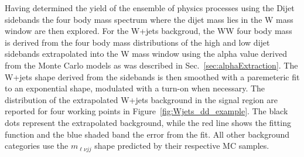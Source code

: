 Having determined the yield of the ensemble of physics processes using
the Dijet sidebands the four body mass spectrum where the dijet mass
lies in the W mass window are then explored.  For the W+jets
backgroud, the WW four body mass is derived from the four body mass
distributions of the high and low dijet sidebands extrapolated into
the W mass window using the alpha value derived from the Monte Carlo
models as was described in Sec.~\ref{sec:alphaExtraction}.  The W+jets
shape derived from the sidebands is then smoothed with a paremeteric
fit to an exponential shape, modulated with a turn-on when necessary. 
The distribution of the extrapolated W+jets background in the signal region are reported for four working
points in Figure~\ref{fig:Wjets_dd_example}.  The black dots represent
the extrapolated background, while the red line shows the fitting
function and the blue shaded band the error from the fit.  All other
background categories use the $m_{\ell\nu jj}$ shape predicted by their
respective MC samples.
